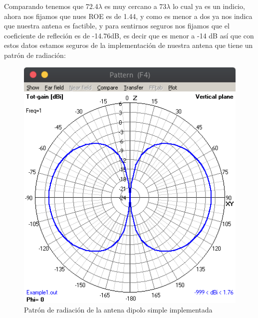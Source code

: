 \documentclass[11pt,a4paper]{article}
\begin{document}
Comparando tenemos que 72.4$\lambda$ es muy cercano a 73$\lambda$ lo cual ya es un indicio, ahora nos fijamos que nues ROE es de 1.44, y como es menor a dos ya nos indica que nuestra antena es factible, y para sentirnos seguros nos fijamos que el coeficiente de refleci\'on es de -14.76dB, es decir que es menor a -14 dB as\'i que con estos datos estamos seguros de la implementaci\'on de nuestra antena que tiene un patr\'on de radiaci\'on:

    \begin{figure}[H]
    \centering
    \includegraphics[scale=0.35]{images/dipolo/1pattern.png}
    \caption{Patr\'on de radiaci\'on de la antena dipolo simple implementada}
    \label{fig3:yagui2d}
    \end{figure}
\end{document}
